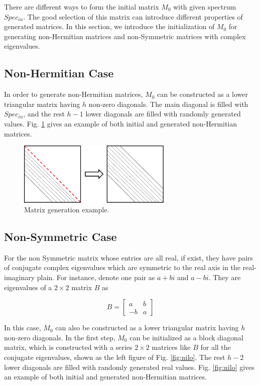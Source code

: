 \documentclass[a4paper, 10 pt]{report}
\begin{document}
	There are different ways to form the initial matrix $M_0$ with given spectrum $Spec_{in}$. The good selection of this matrix can introduce different properties of generated matrices. In this section, we introduce the initialization of $M_0$ for generating non-Hermitian matrices and non-Symmetric matrices with complex eigenvalues.
	
	\subsection{Non-Hermitian Case}
	
	In order to generate non-Hermitian matrices, $M_0$ can be constructed as a lower triangular matrix having $h$ non-zero diagonals. The main diagonal is filled with $Spec_{in}$, and the rest $h-1$ lower diagonals are filled with randomly generated values. Fig. \ref{fig:nonhermitian} gives an example of both initial and generated non-Hermitian matrices.
	
	\begin{figure}[htbp]
		\centering
		\includegraphics[width=2.9in]{img/non-Herm.pdf}
		\caption{Matrix generation example.}
		\label{fig:nonhermitian}
	\end{figure}

	\subsection{Non-Symmetric Case}
	
	For the non Symmetric matrix whose entries are all real, if exist, they have pairs of conjugate complex eigenvalues which are symmetric to the real axis in the real-imaginary plain. For instance, denote one pair as $a+bi$ and $a-bi$. They are eigenvalues of a $2\times 2$ matrix $B$ as 
	
	\[
	B =
	\begin{bmatrix}
	a & b \\
	-b & a
	\end{bmatrix}
	\]
	
	In this case, $M_0$ can also be constructed as a lower triangular matrix having $h$ non-zero diagonals. In the first step, $M_0$ can be initialized as a block diagonal matrix, which is constructed with a series $2 \times 2$ matrices like $B$ for all the conjugate eigenvalues, shown as the left figure of Fig. \ref{fig:nilo}. The rest $h-2$ lower diagonals are filled with randomly generated real values. Fig. \ref{fig:nilo} gives an example of both initial and generated non-Hermitian matrices.
		
\end{document}
